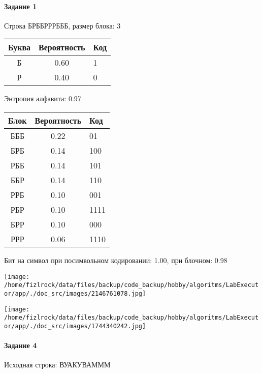 \documentclass[a4paper, 12pt]{article}
\begin{document}
\paragraph{Задание 1}

Строка БРББРРРБББ, размер блока: 3
\begin{center}
 \begin{tabular}{ |c|c|l| } 
  \hline
     Буква & Вероятность & Код\\ \hline
Б & 0.60 & 1\\\hline
Р & 0.40 & 0
\\ \hline \end{tabular}
\end{center}
Энтропия алфавита: 0.97
\begin{center}
 \begin{tabular}{ |c|c|l| } 
  \hline
     Блок & Вероятность & Код\\ \hline
БББ & 0.22 & 01\\\hline
БРБ & 0.14 & 100\\\hline
РББ & 0.14 & 101\\\hline
ББР & 0.14 & 110\\\hline
РРБ & 0.10 & 001\\\hline
РБР & 0.10 & 1111\\\hline
БРР & 0.10 & 000\\\hline
РРР & 0.06 & 1110
\\ \hline \end{tabular}
\end{center}
Бит на символ при посимвольном кодировании: 1.00, при блочном: 0.98

\texttt{[image: /home/fizlrock/data/files/backup/code\_backup/hobby/algoritms/LabExecutor/app/./doc\_src/images/2146761078.jpg]}

\texttt{[image: /home/fizlrock/data/files/backup/code\_backup/hobby/algoritms/LabExecutor/app/./doc\_src/images/1744340242.jpg]}
\paragraph{Задание 4}


Исходная строка: ВУАКУВАМММ
\end{document}
